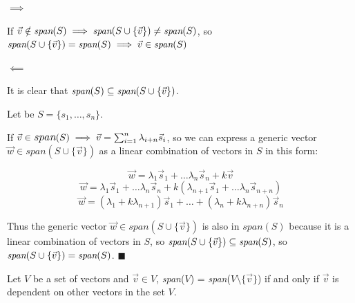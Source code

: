 \begin{tcolorbox}[colback=def_color,coltitle=black,coltext=black,colframe=pro_color_back,title=\textbf{Proof}] 

$\implies$

If $\vec v \notin \textit{span}(S) \implies \textit{span}{\normalfont (S \cup \{\vec v\}) \neq \textit{span}(S)}$, so $\textit{span}{\normalfont (S \cup \{\vec v\}) = \textit{span}(S)} \implies \vec v \in \textit{span}{\normalfont (S)}$

$\impliedby$

It is clear that $\textit{span}(S) \subseteq \textit{span}{\normalfont (S \cup \{\vec v\})}$.

Let be $S = \{s_1, \dots, s_n\}$.

If $\large \vec v \in \textit{span}(S) \implies \vec v = \sum_{i = 1}^{n} \lambda_{i+n} \vec s_i$, so 
we can express a generic vector $\vec w \in \textit{span}(S \cup \{\vec v\})$ as a linear combination of
vectors in $S$ in this form:

$$
\vec w = \lambda_1 \vec s_1 + \dots \lambda_n \vec s_n + k \vec v
$$
$$
\vec w = \lambda_1 \vec s_1 + \dots \lambda_n \vec s_n + k(\lambda_{n+1} \vec s_1 + \dots \lambda_n \vec s_{n+n})
$$
$$
\vec w = (\lambda_1 + k\lambda_{n+1}) \vec s_1 + \dots + (\lambda_n + k\lambda_{n+n}) \vec s_n
$$

Thus the generic vector $\vec w \in \textit{span}(S \cup \{\vec v\})$ is also in $\textit{span}(S)$ because it is a linear combination of vectors in $S$, so $\textit{span}{\normalfont (S \cup \{\vec v\})} \subseteq \textit{span}(S)$, so $\textit{span}{\normalfont (S \cup \{\vec v\})} = \textit{span}(S)$. $\blacksquare$
\end{tcolorbox}

\begin{tcolorbox}[colback=def_color,colframe=gray,coltext=black] \begin{corollary}
    Let $V$ be a set of vectors and $\vec v \in V$, \textit{span}{\normalfont ($V$) = \textit{span}($V \setminus \{\vec v\}$)} if and only if $\vec v$ is dependent on other vectors in the set $V$.
    \label{cor:same-span}
\end{corollary}
\end{tcolorbox}

